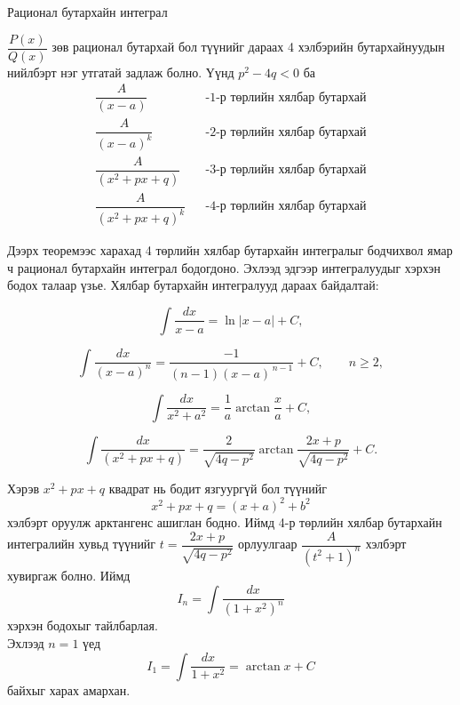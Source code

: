 \begin{frame}[allowframebreaks]{Рационал бутархайн интеграл}
\begin{theorem}
$\dfrac{P(x)}{Q(x)}$ зөв рационал бутархай бол түүнийг дараах 4 хэлбэрийн бутархайнуудын нийлбэрт нэг утгатай задлаж болно. Үүнд $p^2-4q<0$ ба 
 \begin{eqnarray}
\dfrac{A}{(x-a)}&&\text{-1-р төрлийн хялбар бутархай}\nonumber\\
\dfrac{A}{(x-a)^k}&&\text{-2-р төрлийн хялбар бутархай}\nonumber\\
\dfrac{A}{(x^2+px+q)}&&\text{-3-р төрлийн хялбар бутархай}\nonumber\\
\dfrac{A}{(x^2+px+q)^k}&&\text{-4-р төрлийн хялбар бутархай}\nonumber
\end{eqnarray}
\end{theorem}
Дээрх теоремээс харахад 4 төрлийн хялбар бутархайн интегралыг бодчихвол ямар ч рационал бутархайн интеграл бодогдоно. Эхлээд эдгээр интегралуудыг хэрхэн бодох талаар үзье. 
Хялбар бутархайн интегралууд дараах байдалтай:

\[
\int \frac{dx}{x-a}=\ln|x-a|+C,
\]

\[
\int \frac{dx}{(x-a)^n}=\frac{-1}{(n-1)(x-a)^{\,n-1}}+C,
\qquad n\ge 2,
\]

\[
\int\frac{dx}{x^2+a^2}=\frac{1}{a}\arctan\frac{x}{a}+C,
\]

\[
\int\frac{dx}{(x^2+px+q)}=\frac{2}{\sqrt{4q-p^2}}
\arctan\frac{2x+p}{\sqrt{4q-p^2}}+C.
\]

Хэрэв $x^2+px+q$ квадрат нь бодит язгуургүй бол түүнийг
\[
x^2+px+q=(x+a)^2+b^2
\]
хэлбэрт оруулж арктангенс ашиглан бодно.  Иймд 4-р төрлийн хялбар бутархайн интегралийн хувьд түүнийг $t=\dfrac{2x+p}{\sqrt{4q-p^2}}$ орлуулгаар $\dfrac{A}{(t^2+1)^n}$ хэлбэрт хувиргаж болно. Иймд
$$\displaystyle I_n = \int \frac{dx}{(1+x^2)^n}$$ хэрхэн бодохыг тайлбарлая.\\

Эхлээд $n=1$ үед
\[
I_1 = \int \frac{dx}{1+x^2} = \arctan x+C
\]
байхыг харах амархан. 


\end{frame}
